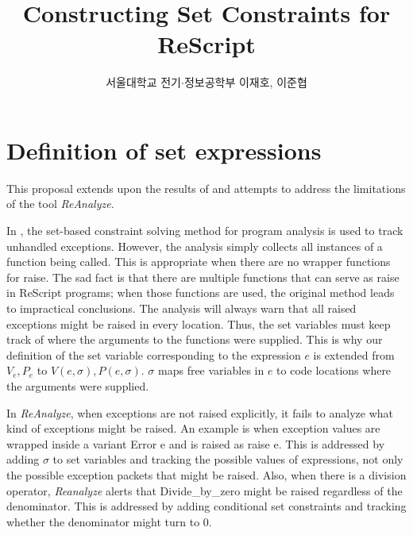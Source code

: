 \documentclass{article}
\title{Constructing Set Constraints for ReScript}
\author{서울대학교 전기$\cdot$정보공학부 이재호, 이준협}
\date{}
\begin{document}
\maketitle
\section{Definition of set expressions}

This proposal extends upon the results of \cite{YiRyu97} and attempts to address the limitations of the tool \textit{ReAnalyze}.

In \cite{YiRyu97}, the set-based constraint solving method for program analysis is used to track unhandled exceptions.
However, the analysis simply collects all instances of a function being called.
This is appropriate when there are no wrapper functions for \textsf{raise}.
The sad fact is that there are multiple functions that can serve as \textsf{raise} in ReScript programs; when those functions are used, the original method leads to impractical conclusions.
The analysis will always warn that all raised exceptions might be raised in every location.
Thus, the set variables must keep track of where the arguments to the functions were supplied.
This is why our definition of the set variable corresponding to the expression $e$ is extended from $V_{e},P_{e}$ to $V(e,\sigma),P(e,\sigma)$.
$\sigma$ maps free variables in $e$ to code locations where the arguments were supplied.

In \textit{ReAnalyze}, when exceptions are not raised explicitly, it fails to analyze what kind of exceptions might be raised.
An example is when exception values are wrapped inside a variant \textsf{Error e} and is raised as \textsf{raise e}.
This is addressed by adding $\sigma$ to set variables and tracking the possible values of expressions, not only the possible exception packets that might be raised.
Also, when there is a division operator, \textit{Reanalyze} alerts that \textsf{Divide\_by\_zero} might be raised regardless of the denominator.
This is addressed by adding conditional set constraints and tracking whether the denominator might turn to 0.
\end{document}
